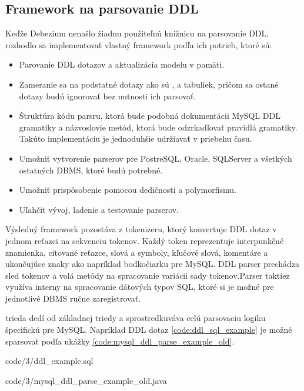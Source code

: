 \subsection{Framework na parsovanie DDL}
Keďže Debezium nenašlo žiadnu použiteľnú knižnicu na parsovanie DDL, rozhodlo sa implementovať vlastný framework podľa ich potrieb, ktoré sú\cite{debezium:parse_ddl}:
\begin{itemize}
\item Parovanie DDL dotazov a aktualizácia modelu v pamäti.
\item Zameranie sa na podstatné dotazy ako sú ,  a  tabuliek, pričom sa ostané dotazy budú ignorovať bez nutnosti ich parsovať.
\item Štruktúra kódu parsru, ktorá bude podobná dokumentácii MySQL DDL gramatiky a názvoslovie metód, ktorá bude odzrkadľovať pravidlá gramatiky. Takúto implementáciu je jednoduhšie udržiavať v priebehu času.
\item Umožniť vytvorenie parserov pre PostreSQL, Oracle, SQLServer a všetkých ostatných DBMS, ktoré budú potrebné.
\item Umožniť prispôsobenie pomocou dedičnosti a polymorfismu.
\item Uľahčit vývoj, ladenie a testovanie parserov.
\end{itemize}

Výsledný framework pozostáva z tokenizeru, ktorý konvertuje DDL dotaz v jednom reťazci na sekvenciu tokenov. Každý token reprezentuje interpunkčné znamienka, citované reťazce, slová a symboly, kľučové slová, komentáre a ukončujúce znaky ako napríklad bodkočiarku pre MySQL. DDL parser prechádza sled tokenov a volá metódy na spracovanie variácii sady tokenov.Parser taktiez využíva interny  na spracovanie dátových typov SQL, ktoré si je možné pre jednotlivé DBMS ručne zaregistrovať.

 trieda dedí od základnej triedy  a sprostredkuváva celú parsovaciu logiku špecifickú pre MySQL. Napríklad DDL dotaz \ref{code:ddl_sql_example} je možné sparsovať podľa ukážky \ref{code:mysql_ddl_parse_example_old}.


            {code/3/ddl_example.sql}
            

            {code/3/mysql_ddl_parse_example_old.java}
            
